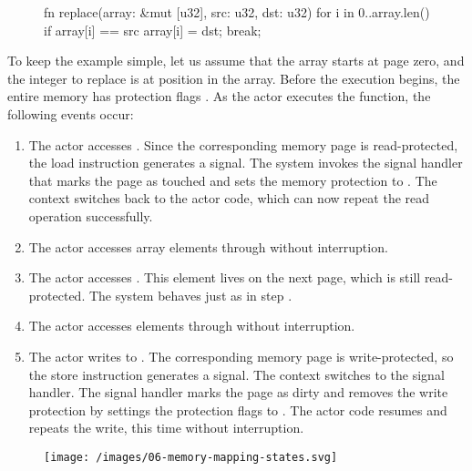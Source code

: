 \documentclass{article}
\begin{document}
\begin{figure}
\begin{code}[rust]
fn replace(array: &mut [u32], src: u32, dst: u32) {
  for i in 0..array.len() {
    if array[i] == src {
      array[i] = dst;
      break;
    }
  }
}
\end{code}
\end{figure}

To keep the example simple, let us assume that the array starts at page zero, and the integer to replace is at position  in the array.
Before the execution begins, the entire memory has protection flags .
As the actor executes the  function, the following events occur:
\begin{enumerate}
  \item 
    The actor accesses .
    Since the corresponding memory page is read-protected, the load instruction generates a  signal.
    The system invokes the signal handler that marks the page as touched and sets the memory protection to .
    The context switches back to the actor code, which can now repeat the read operation successfully.
  \item 
    The actor accesses array elements  through  without interruption.
  \item 
    The actor accesses .
    This element lives on the next page, which is still read-protected.
    The system behaves just as in step .
  \item 
    The actor accesses elements  through  without interruption.
  \item 
    The actor writes to .
    The corresponding memory page is write-protected, so the store instruction generates a  signal.
    The context switches to the signal handler.
    The signal handler marks the page as dirty and removes the write protection by settings the protection flags to .
    The actor code resumes and repeats the write, this time without interruption.
\end{enumerate}

\begin{figure}[grayscale-diagram]
\texttt{[image: /images/06-memory-mapping-states.svg]}
\end{figure}
\end{document}
